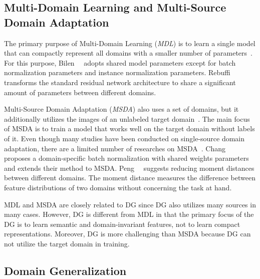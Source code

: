 \subsection{Multi-Domain Learning and Multi-Source Domain Adaptation}
The primary purpose of Multi-Domain Learning (\textit{MDL}) is to learn a single model that can compactly represent all domains with a smaller number of parameters~\cite{}. For this purpose, Bilen~\etal~\cite{} adopts shared model parameters except for batch normalization parameters and instance normalization parameters. Rebuffi~\etal~\cite{} transforms the standard residual network architecture to share a significant amount of parameters between different domains.

Multi-Source Domain Adaptation (\textit{MSDA}) also uses a set of domains, but it additionally utilizes the images of an unlabeled target domain~\cite{}. The main focus of MSDA is to train a model that works well on the target domain without labels of it. Even though many studies have been conducted on single-source domain adaptation, there are a limited number of researches on MSDA~\cite{}. Chang~\etal~\cite{} proposes a domain-specific batch normalization with shared weights parameters and extends their method to MSDA. Peng~\etal~\cite{} suggests reducing moment distances between different domains. The moment distance measures the difference between feature distributions of two domains without concerning the task at hand.

MDL and MSDA are closely related to DG since DG also utilizes many sources in many cases. However, DG is different from MDL in that the primary focus of the DG is to learn semantic and domain-invariant features, not to learn compact representations. Moreover, DG is more challenging than MSDA because DG can not utilize the target domain in training.


\subsection{Domain Generalization}
